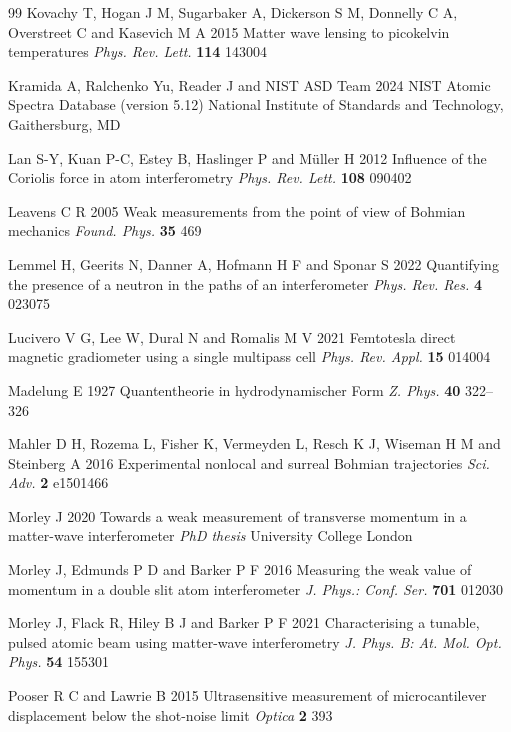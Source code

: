 \documentclass[11pt,a4paper]{article}
\begin{document}
\begin{thebibliography}{99}
Kovachy T, Hogan J M, Sugarbaker A, Dickerson S M, Donnelly C A, Overstreet C and Kasevich M A 2015 Matter wave lensing to picokelvin temperatures \textit{Phys. Rev. Lett.} \textbf{114} 143004

Kramida A, Ralchenko Yu, Reader J and NIST ASD Team 2024 NIST Atomic Spectra Database (version 5.12) National Institute of Standards and Technology, Gaithersburg, MD

Lan S-Y, Kuan P-C, Estey B, Haslinger P and M\"uller H 2012 Influence of the Coriolis force in atom interferometry \textit{Phys. Rev. Lett.} \textbf{108} 090402

Leavens C R 2005 Weak measurements from the point of view of Bohmian mechanics \textit{Found. Phys.} \textbf{35} 469

Lemmel H, Geerits N, Danner A, Hofmann H F and Sponar S 2022 Quantifying the presence of a neutron in the paths of an interferometer \textit{Phys. Rev. Res.} \textbf{4} 023075

Lucivero V G, Lee W, Dural N and Romalis M V 2021 Femtotesla direct magnetic gradiometer using a single multipass cell \textit{Phys. Rev. Appl.} \textbf{15} 014004

Madelung E 1927 Quantentheorie in hydrodynamischer Form \textit{Z. Phys.} \textbf{40} 322--326

Mahler D H, Rozema L, Fisher K, Vermeyden L, Resch K J, Wiseman H M and Steinberg A 2016 Experimental nonlocal and surreal Bohmian trajectories \textit{Sci. Adv.} \textbf{2} e1501466

Morley J 2020 Towards a weak measurement of transverse momentum in a matter-wave interferometer \textit{PhD thesis} University College London

Morley J, Edmunds P D and Barker P F 2016 Measuring the weak value of momentum in a double slit atom interferometer \textit{J. Phys.: Conf. Ser.} \textbf{701} 012030

Morley J, Flack R, Hiley B J and Barker P F 2021 Characterising a tunable, pulsed atomic beam using matter-wave interferometry \textit{J. Phys. B: At. Mol. Opt. Phys.} \textbf{54} 155301

Pooser R C and Lawrie B 2015 Ultrasensitive measurement of microcantilever displacement below the shot-noise limit \textit{Optica} \textbf{2} 393


\end{thebibliography}
\end{document}
